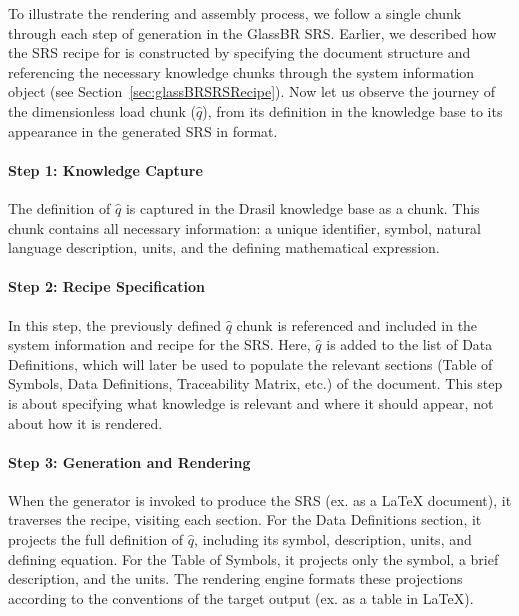To illustrate the rendering and assembly process, we follow a single chunk 
through each step of generation in the GlassBR SRS. Earlier, we 
described how the SRS recipe for \gb{} is constructed by specifying the 
document structure and referencing the necessary knowledge chunks through the 
system information object (see Section~\ref{sec:glassBRSRSRecipe}). Now let us 
observe the journey of the dimensionless load chunk ($\hat{q}$), from 
its definition in the knowledge base to its appearance in the generated SRS in 
 format.

\paragraph{Step 1: Knowledge Capture}

The definition of $\hat{q}$ is captured in the Drasil knowledge base as a 
chunk. This chunk contains all necessary information: a unique identifier, 
symbol, natural language description, units, and the defining mathematical 
expression.


\paragraph{Step 2: Recipe Specification}

In this step, the previously defined $\hat{q}$ chunk is referenced and included 
in the system information and recipe for the \gb{} SRS. Here, $\hat{q}$ is 
added to the list of Data Definitions, which will later be used to populate the 
relevant sections (Table of Symbols, Data Definitions, Traceability Matrix, 
etc.) of the document. This step is about specifying what 
knowledge is relevant and where it should appear, not about how it is rendered.

\paragraph{Step 3: Generation and Rendering}
When the generator is invoked to produce the SRS (ex. as a \LaTeX{} document), 
it traverses the recipe, visiting each section. For the Data Definitions 
section, it projects the full definition of $\hat{q}$, including its symbol, 
description, units, and defining equation. For the Table of Symbols, it 
projects only the symbol, a brief description, and the units. The rendering 
engine formats these projections according to the conventions of the target 
output (ex. as a table in \LaTeX{}).

